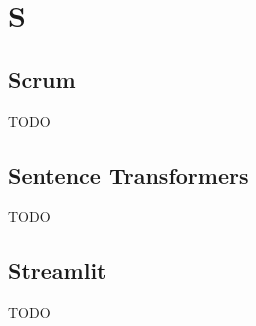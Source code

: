 \section{S}

\subsection{Scrum}
TODO

\subsection{Sentence Transformers}
TODO

\subsection{Streamlit}
TODO


